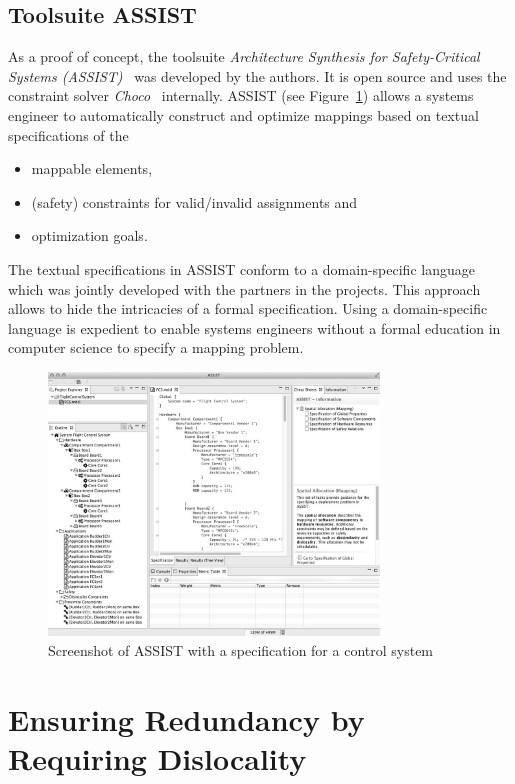 \documentclass[english,biblatex]{lni}
\begin{document}
\subsection{Toolsuite ASSIST}

As a proof of concept, the toolsuite \emph{Architecture Synthesis for Safety-Critical Systems (ASSIST)}~\cite{ASSIST} was developed by the authors.
It is open source and uses the constraint solver \emph{Choco}~\cite{Prudhomme2016} internally.
ASSIST (see Figure~\ref{tool}) allows a systems engineer to automatically construct and optimize mappings based on textual specifications of the
\begin{itemize}
\item mappable elements,
\item (safety) constraints for valid/invalid assignments and 
\item optimization goals.
\end{itemize}
The textual specifications in ASSIST conform to a domain-specific language which was jointly developed with the partners in the projects.
This approach allows to hide the intricacies of a formal specification.
Using a domain-specific language is expedient to enable systems engineers without a formal education in computer science to specify a mapping problem.

\begin{figure}[!t]
\centering
\includegraphics[height=7cm]{tool}
\caption{Screenshot of ASSIST with a specification for a control system}
\label{tool}
\end{figure}


\section{Ensuring Redundancy by Requiring Dislocality}
\end{document}
